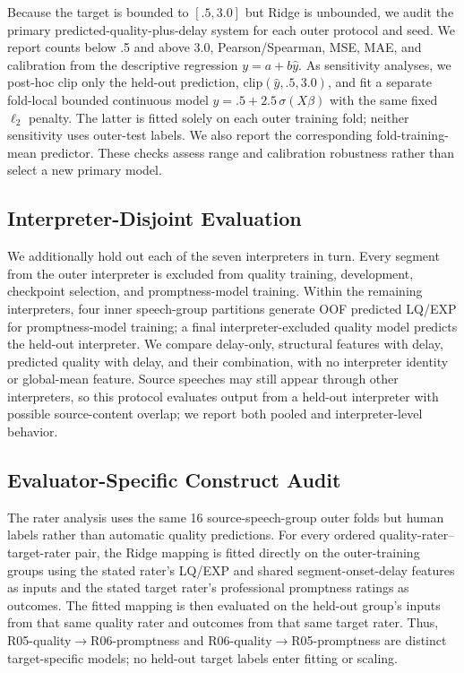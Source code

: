 Because the target is bounded to $[.5,3.0]$ but Ridge is unbounded, we audit the primary predicted-quality-plus-delay system for each outer protocol and seed. We report counts below .5 and above 3.0, Pearson/Spearman, MSE, MAE, and calibration from the descriptive regression $y=a+b\hat y$. As sensitivity analyses, we post-hoc clip only the held-out prediction, $\mathrm{clip}(\hat y,.5,3.0)$, and fit a separate fold-local bounded continuous model $\hat y=.5+2.5\,\sigma(X\beta)$ with the same fixed $\ell_2$ penalty. The latter is fitted solely on each outer training fold; neither sensitivity uses outer-test labels. We also report the corresponding fold-training-mean predictor. These checks assess range and calibration robustness rather than select a new primary model.

\subsection{Interpreter-Disjoint Evaluation}
We additionally hold out each of the seven interpreters in turn. Every segment from the outer interpreter is excluded from quality training, development, checkpoint selection, and promptness-model training. Within the remaining interpreters, four inner speech-group partitions generate OOF predicted LQ/EXP for promptness-model training; a final interpreter-excluded quality model predicts the held-out interpreter. We compare delay-only, structural features with delay, predicted quality with delay, and their combination, with no interpreter identity or global-mean feature. Source speeches may still appear through other interpreters, so this protocol evaluates output from a held-out interpreter with possible source-content overlap; we report both pooled and interpreter-level behavior.

\subsection{Evaluator-Specific Construct Audit}
The rater analysis uses the same 16 source-speech-group outer folds but human labels rather than automatic quality predictions. For every ordered quality-rater--target-rater pair, the Ridge mapping is fitted directly on the outer-training groups using the stated rater's LQ/EXP and shared segment-onset-delay features as inputs and the stated target rater's professional promptness ratings as outcomes. The fitted mapping is then evaluated on the held-out group's inputs from that same quality rater and outcomes from that same target rater. Thus, R05-quality$\rightarrow$R06-promptness and R06-quality$\rightarrow$R05-promptness are distinct target-specific models; no held-out target labels enter fitting or scaling.

